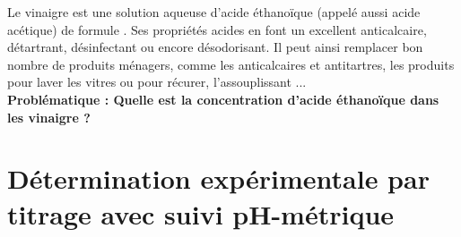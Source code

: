 \documentclass[a4paper,11pt,fleqn]{article}%
\begin{document}
\maketitle

Le vinaigre est une solution aqueuse d'acide éthanoïque (appelé aussi acide acétique) de formule . Ses propriétés acides en font un excellent anticalcaire, détartrant, désinfectant ou encore désodorisant. Il peut ainsi remplacer bon nombre de produits ménagers, comme les anticalcaires et antitartres, les produits pour laver les vitres ou pour récurer, l'assouplissant ...\\
\textbf{Problématique : Quelle est la concentration d'acide éthanoïque dans les vinaigre ?}
\section{Détermination expérimentale par titrage avec suivi pH-métrique}
\end{document}
